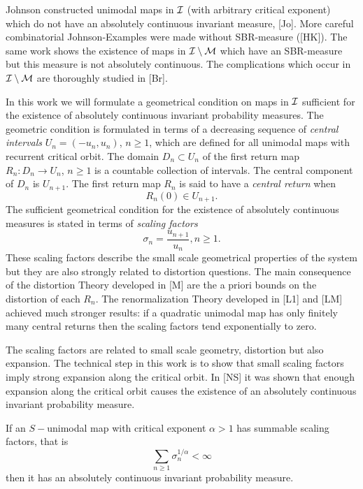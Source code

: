\flushpar
Johnson constructed 
 unimodal maps in $\Cal{I}$ (with arbitrary critical 
exponent) which do not have an
absolutely continuous invariant measure, [Jo]. More careful 
combinatorial Johnson-Examples were made without SBR-measure ([HK]). 
The same work 
shows the existence of maps in $\Cal{I}\setminus \Cal{M}$ which have
an SBR-measure but this measure is not absolutely continuous. The complications
which occur in $\Cal{I}\setminus \Cal{M}$ are thoroughly studied in [Br].

\bigskip

\flushpar
In this work we will formulate a geometrical condition on maps in 
$\Cal{I}$ sufficient for the existence of absolutely continuous invariant 
probability measures. 
The geometric condition is formulated in terms of a decreasing sequence of 
{\it central intervals} $U_n=(-u_n,u_n)$, $n\ge 1$, which are defined for
all unimodal maps with recurrent critical orbit. The domain $D_n\subset U_n$
of the first return map $R_n:D_n\to U_n$, $n\ge 1$ is a countable collection 
of intervals. The central component of $D_n$ is $U_{n+1}$. The first return 
map $R_n$ is said to have a {\it central return} when
$$
R_n(0)\in U_{n+1}.
$$ 
The sufficient geometrical condition for the existence of absolutely
continuous measures is stated in terms of {\it scaling factors}
$$
\sigma_n=\frac{u_{n+1}}{u_n}, n\ge 1.
$$
These scaling factors describe the small scale geometrical properties of the
system but they are also strongly related to distortion questions.
The main consequence of the distortion Theory developed in [M] are the 
a priori bounds
on the distortion of each $R_n$. The renormalization Theory developed in [L1] 
and [LM] achieved much stronger results: if a quadratic unimodal map has only 
finitely many central returns then the scaling factors tend exponentially to 
zero.

\flushpar
The scaling factors are related to small scale geometry, distortion but also 
expansion. The technical step in this work is to show that small 
scaling factors imply strong expansion along the critical orbit. In [NS] 
it was shown that enough expansion along the critical orbit causes the 
existence of an absolutely continuous invariant probability measure.

 If an $S-$unimodal map with critical exponent $\alpha>1$
has summable scaling factors, that is
$$
\sum_{n\ge 1} \sigma_n^{1/\alpha} < \infty
$$
then it has an absolutely continuous invariant probability measure.
\endproclaim

